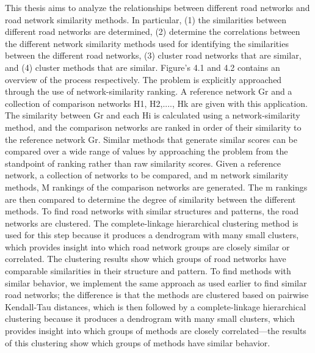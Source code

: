
This thesis aims to analyze the relationships between different road networks and road network similarity methods. In particular,  (1) the similarities between different road networks are determined, (2) determine the correlations between the different network similarity methods used for identifying the similarities between the different road networks, (3) cluster road networks that are similar, and (4) cluster methods that are similar. Figure's 4.1 and 4.2 contains an overview of the process respectively. The problem is explicitly approached through the use of network-similarity ranking. A reference network Gr and a collection of comparison networks H1, H2,...., Hk are given with this application. The similarity between Gr and each Hi is calculated using a network-similarity method, and the comparison networks are ranked in order of their similarity to the reference network Gr. Similar methods that generate similar scores can be compared over a wide range of values by approaching the problem from the standpoint of ranking rather than raw similarity scores. Given a reference network, a collection of networks to be compared, and m network similarity methods, M rankings of the comparison networks are generated. The m rankings are then compared to determine the degree of similarity between the different methods.
 To find road networks with similar structures and patterns, the road networks are clustered.
The complete-linkage hierarchical clustering method is used for this step because it produces a dendrogram with many small clusters, which provides insight into which road network groups are closely similar or correlated. The clustering results show which groups of road networks have comparable similarities in their structure and pattern. To find methods with similar behavior, we implement the same approach as used earlier to find similar road networks; the difference is that the methods are clustered based on pairwise Kendall-Tau distances, which is then followed by a complete-linkage hierarchical clustering because it produces a dendrogram with many small clusters, which provides insight into which groups of methods are closely correlated—the results of this clustering show which groups of methods have similar behavior.


